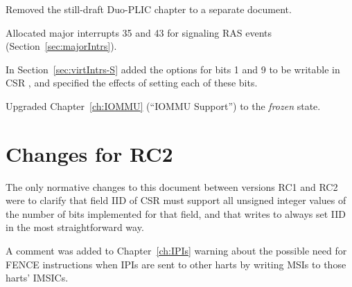 Removed the still-draft Duo-PLIC chapter to a separate document.

Allocated major interrupts 35 and 43 for signaling RAS events
(Section~\ref{sec:majorIntrs}).

In Section~\ref{sec:virtIntrs-S} added the options
for bits 1 and 9 to be writable in CSR ,
and specified the effects of setting each of these bits.

Upgraded Chapter~\ref{ch:IOMMU} (``IOMMU Support'')
to the \emph{frozen} state.

\section*{Changes for RC2}

The only normative changes to this document
between versions RC1 and RC2 were to clarify that
field IID of CSR  must support all
unsigned integer values of the number of bits implemented
for that field, and that writes to 
always set IID in the most straightforward way.

A comment was added to Chapter~\ref{ch:IPIs} warning about
the possible need for FENCE instructions when IPIs are
sent to other harts by writing MSIs to those harts' IMSICs.

